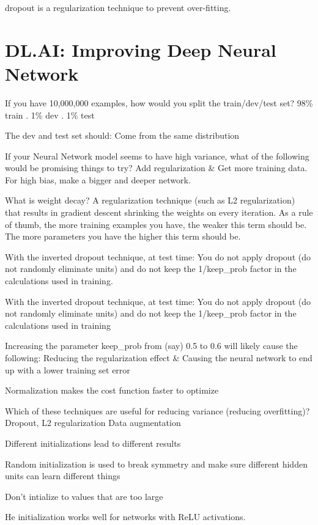 \documentclass[]{book}
\begin{document}
dropout is a regularization technique to prevent over-fitting.

\section{DL.AI: Improving Deep Neural
Network}\label{dl.ai-improving-deep-neural-network}

If you have 10,000,000 examples, how would you split the train/dev/test
set? 98\% train . 1\% dev . 1\% test

The dev and test set should: Come from the same distribution

If your Neural Network model seems to have high variance, what of the
following would be promising things to try? Add regularization \& Get
more training data. For high bias, make a bigger and deeper network.

What is weight decay? A regularization technique (such as L2
regularization) that results in gradient descent shrinking the weights
on every iteration. As a rule of thumb, the more training examples you
have, the weaker this term should be. The more parameters you have the
higher this term should be.

With the inverted dropout technique, at test time: You do not apply
dropout (do not randomly eliminate units) and do not keep the
1/keep\_prob factor in the calculations used in training.

With the inverted dropout technique, at test time: You do not apply
dropout (do not randomly eliminate units) and do not keep the
1/keep\_prob factor in the calculations used in training

Increasing the parameter keep\_prob from (say) 0.5 to 0.6 will likely
cause the following: Reducing the regularization effect \& Causing the
neural network to end up with a lower training set error

Normalization makes the cost function faster to optimize

Which of these techniques are useful for reducing variance (reducing
overfitting)? Dropout, L2 regularization Data augmentation

Different initializations lead to different results

Random initialization is used to break symmetry and make sure different
hidden units can learn different things

Don't intialize to values that are too large

He initialization works well for networks with ReLU activations.
\end{document}
